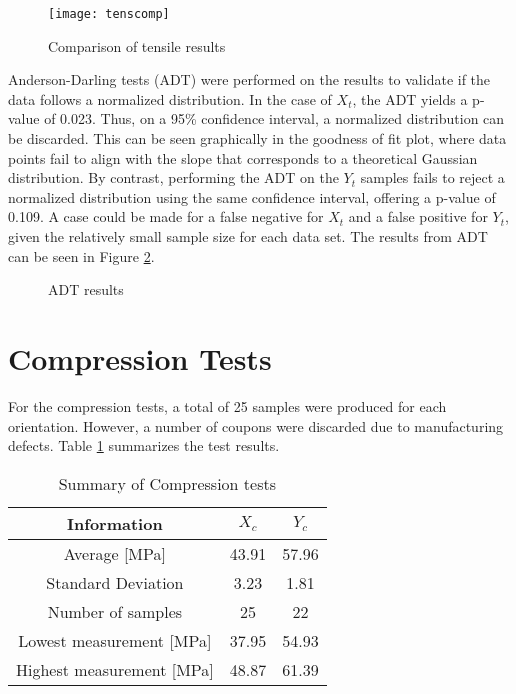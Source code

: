 \documentclass[main.tex]{subfiles}
\begin{document}
\begin{figure}[h]
	\center
	\texttt{[image: tenscomp]}
	\caption{Comparison of tensile results} \label{fig:tensComp}
\end{figure}

Anderson-Darling tests (ADT) were performed on the results to validate if the data follows a normalized distribution. In the case of $X_t$, the ADT yields a p-value of 0.023. Thus, on a 95\% confidence interval, a normalized distribution can be discarded. This can be seen graphically in the goodness of fit plot, where data points fail to align with the slope that corresponds to a theoretical Gaussian distribution. By contrast, performing the ADT on the $Y_t$ samples fails to reject a normalized distribution using the same confidence interval, offering a p-value of 0.109. A case could be made for a false negative for $X_t$ and a false positive for $Y_t$, given the relatively small sample size for each data set. The results from ADT can be seen in Figure \ref{fig:adttens}.

\begin{figure}[!htbp]
	\center
	\hfill
	\caption{ADT results} \label{fig:adttens}
\end{figure}
      
\section{Compression Tests} \label{sec:compr}
For the compression tests, a total of 25 samples were produced for each orientation. However, a number of coupons were discarded due to manufacturing defects. Table \ref{tab:comprtab} summarizes the test results.  

\begin{table} [h]
	\centering
	\caption{Summary of Compression tests}%
	\begin{tabular}{ c| c c } 
		\toprule
		\textbf{Information} & $X_c$ & $Y_c$\\
		\midrule
		Average [MPa] &43.91  & 57.96\\
		Standard Deviation &3.23  & 1.81\\
		Number of samples &25  & 22\\
		Lowest measurement [MPa] &37.95 &54.93 \\
		Highest measurement [MPa] &48.87 &61.39 \\
		\bottomrule
	\end{tabular}
\label{tab:comprtab}
\end{table}
\end{document}
